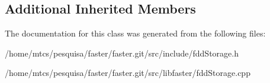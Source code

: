 \subsection*{Additional Inherited Members}


The documentation for this class was generated from the following files\+:\begin{DoxyCompactItemize}
\item 
/home/mtcs/pesquisa/faster/faster.\+git/src/include/fdd\+Storage.\+h\item 
/home/mtcs/pesquisa/faster/faster.\+git/src/libfaster/fdd\+Storage.\+cpp\end{DoxyCompactItemize}

